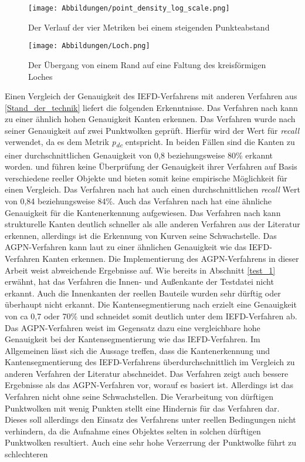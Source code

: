 \begin{figure}[t]
	\texttt{[image: Abbildungen/point\_density\_log\_scale.png]}
	\centering
	\caption{Der Verlauf der vier Metriken bei einem steigenden Punkteabstand}
	\label{fig: point_density_trend}
\end{figure}

\begin{figure}[t]
	\texttt{[image: Abbildungen/Loch.png]}
	\centering
	\caption{Der Übergang von einem Rand auf eine Faltung des kreisförmigen Loches}
	\label{fig: Loch}
\end{figure}

Einen Vergleich der Genauigkeit des IEFD-Verfahrens mit anderen Verfahren aus \ref{Stand_der_technik} liefert die folgenden Erkenntnisse. Das Verfahren nach \textcite{ahmed_edge_2018} kann zu einer ähnlich hohen Genauigkeit Kanten erkennen. Das Verfahren wurde nach seiner Genauigkeit auf zwei Punktwolken geprüft. Hierfür wird der Wert für \textit{recall} verwendet, da es dem Metrik \textit{p\textsubscript{dc}} entspricht. In beiden Fällen sind die Kanten zu einer durchschnittlichen Genauigkeit von 0,8 beziehungsweise 80\% erkannt worden. \textcite{mineo_novel_2019} und \textcite{choi_rgb-d_2013} führen keine Überprüfung der Genauigkeit ihrer Verfahren auf Basis verschiedene reeller Objekte und bieten somit keine empirische Möglichkeit für einen Vergleich. Das Verfahren nach \textcite{bazazian_edc-net_2021} hat auch einen durchschnittlichen \textit{recall} Wert von 0,84 beziehungsweise 84\%. Auch das Verfahren nach \textcite{himeur_pcednet_2021} hat eine ähnliche Genauigkeit für die Kantenerkennung aufgewiesen. Das Verfahren nach \textcite{hu_jsenet_2020}  kann strukturelle Kanten deutlich schneller als alle anderen Verfahren aus der Literatur erkennen, allerdings ist die Erkennung von Kurven seine Schwachstelle. Das AGPN-Verfahren kann laut \textcite{ni_edge_2016} zu einer ähnlichen Genauigkeit wie das IEFD-Verfahren Kanten erkennen. Die Implementierung des AGPN-Verfahrens in dieser Arbeit weist abweichende Ergebnisse auf. Wie bereits in Abschnitt \ref{test_1} erwähnt, hat das Verfahren die Innen- und Außenkante der Testdatei nicht erkannt. Auch die Innenkanten der reellen Bauteile wurden sehr dürftig oder überhaupt nicht erkannt. Die Kantensegmentierung nach \textcite{lu_fast_2019} erzielt eine Genauigkeit von ca 0,7 oder 70\% und schneidet somit deutlich unter dem IEFD-Verfahren ab. Das AGPN-Verfahren weist im Gegensatz dazu eine vergleichbare hohe Genauigkeit bei der Kantensegmentierung wie das IEFD-Verfahren. Im Allgemeinen lässt sich die Aussage treffen, dass die Kantenerkennung und Kantensegmentierung des IEFD-Verfahrens überdurchschnittlich im Vergleich zu anderen Verfahren der Literatur abschneidet. Das Verfahren zeigt auch bessere Ergebnisse als das AGPN-Verfahren vor, worauf es basiert ist. Allerdings ist das Verfahren nicht ohne seine Schwachstellen. Die Verarbeitung von dürftigen Punktwolken mit wenig Punkten stellt eine Hindernis für das Verfahren dar. Dieses soll allerdings den Einsatz des Verfahrens unter reellen Bedingungen nicht verhindern, da die Aufnahme eines Objektes selten in solchen dürftigen Punktwolken resultiert. Auch eine sehr hohe Verzerrung der Punktwolke führt zu schlechteren 